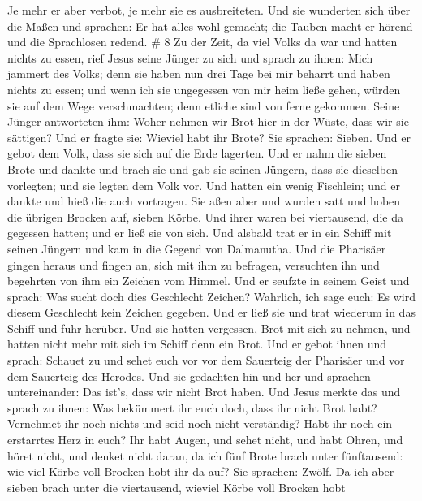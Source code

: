 Je mehr er aber verbot, je mehr sie es ausbreiteten.  Und
sie wunderten sich über die Maßen und sprachen: Er hat alles wohl
gemacht; die Tauben macht er hörend und die Sprachlosen redend. \# 8
 Zu der Zeit, da viel Volks da war und hatten nichts zu
essen, rief Jesus seine Jünger zu sich und sprach zu ihnen: 
Mich jammert des Volks; denn sie haben nun drei Tage bei mir beharrt und
haben nichts zu essen;  und wenn ich sie ungegessen von mir
heim ließe gehen, würden sie auf dem Wege verschmachten; denn etliche
sind von ferne gekommen.  Seine Jünger antworteten ihm:
Woher nehmen wir Brot hier in der Wüste, dass wir sie sättigen?
 Und er fragte sie: Wieviel habt ihr Brote? Sie sprachen:
Sieben.  Und er gebot dem Volk, dass sie sich auf die Erde
lagerten. Und er nahm die sieben Brote und dankte und brach sie und gab
sie seinen Jüngern, dass sie dieselben vorlegten; und sie legten dem
Volk vor.  Und hatten ein wenig Fischlein; und er dankte und
hieß die auch vortragen.  Sie aßen aber und wurden satt und
hoben die übrigen Brocken auf, sieben Körbe.  Und ihrer
waren bei viertausend, die da gegessen hatten; und er ließ sie von sich.
 Und alsbald trat er in ein Schiff mit seinen Jüngern und
kam in die Gegend von Dalmanutha.  Und die Pharisäer gingen
heraus und fingen an, sich mit ihm zu befragen, versuchten ihn und
begehrten von ihm ein Zeichen vom Himmel.  Und er seufzte
in seinem Geist und sprach: Was sucht doch dies Geschlecht Zeichen?
Wahrlich, ich sage euch: Es wird diesem Geschlecht kein Zeichen gegeben.
 Und er ließ sie und trat wiederum in das Schiff und fuhr
herüber.  Und sie hatten vergessen, Brot mit sich zu
nehmen, und hatten nicht mehr mit sich im Schiff denn ein Brot.
 Und er gebot ihnen und sprach: Schauet zu und sehet euch
vor vor dem Sauerteig der Pharisäer und vor dem Sauerteig des Herodes.
 Und sie gedachten hin und her und sprachen untereinander:
Das ist's, dass wir nicht Brot haben.  Und Jesus merkte das
und sprach zu ihnen: Was bekümmert ihr euch doch, dass ihr nicht Brot
habt? Vernehmet ihr noch nichts und seid noch nicht verständig? Habt ihr
noch ein erstarrtes Herz in euch?  Ihr habt Augen, und
sehet nicht, und habt Ohren, und höret nicht, und denket nicht daran,
 da ich fünf Brote brach unter fünftausend: wie viel Körbe
voll Brocken hobt ihr da auf? Sie sprachen: Zwölf.  Da ich
aber sieben brach unter die viertausend, wieviel Körbe voll Brocken hobt
